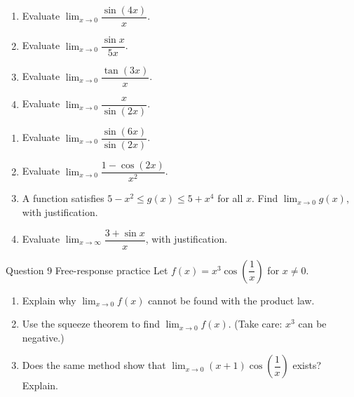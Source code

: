 \documentclass[11pt]{article}
\begin{document}
\begin{enumerate}[leftmargin=*,itemsep=2pt]
  \item Evaluate $\displaystyle\lim_{x\to 0}\dfrac{\sin(4x)}{x}$.\work{2.3cm}
  \item Evaluate $\displaystyle\lim_{x\to 0}\dfrac{\sin x}{5x}$.\work{2.3cm}
  \item Evaluate $\displaystyle\lim_{x\to 0}\dfrac{\tan(3x)}{x}$.\work{2.3cm}
  \item Evaluate $\displaystyle\lim_{x\to 0}\dfrac{x}{\sin(2x)}$.\work{2.3cm}
\end{enumerate}

\begin{enumerate}[leftmargin=*,itemsep=2pt,start=5]
  \item Evaluate $\displaystyle\lim_{x\to 0}\dfrac{\sin(6x)}{\sin(2x)}$.\work{2.8cm}
  \item Evaluate $\displaystyle\lim_{x\to 0}\dfrac{1-\cos(2x)}{x^2}$.\work{2.8cm}
  \item A function satisfies $5-x^2\le g(x)\le5+x^4$ for all $x$. Find $\displaystyle\lim_{x\to 0}g(x)$, with justification.\work{2.8cm}
  \item Evaluate $\displaystyle\lim_{x\to \infty}\dfrac{3+\sin x}{x}$, with justification.\work{2.8cm}
\end{enumerate}

\begin{frbox}{Question 9 \textperiodcentered{} Free-response practice}
Let $f(x)=x^3\cos\!\left(\dfrac1x\right)$ for $x\neq0$.
\begin{enumerate}[label=(\alph*),leftmargin=*,itemsep=2pt]
  \item Explain why $\displaystyle\lim_{x\to 0}f(x)$ cannot be found with the product law.\work{2.6cm}
  \item Use the squeeze theorem to find $\displaystyle\lim_{x\to 0}f(x)$. (Take care: $x^3$ can be negative.)\work{2.6cm}
  \item Does the same method show that $\displaystyle\lim_{x\to 0}(x+1)\cos\!\left(\dfrac1x\right)$ exists? Explain.\work{2.6cm}
\end{enumerate}
\end{frbox}
\end{document}
